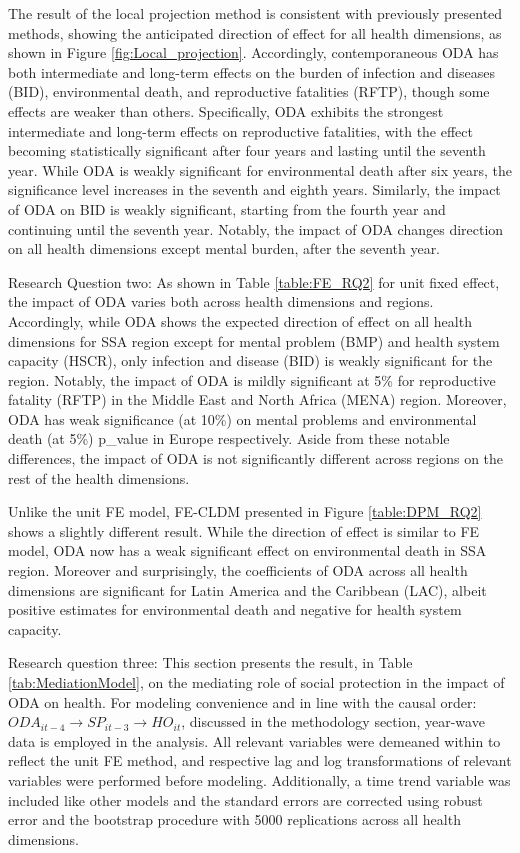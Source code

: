 The result of the local projection method is consistent with previously presented methods, showing the anticipated direction of effect for all health dimensions, as shown in Figure \ref{fig:Local_projection}. Accordingly, contemporaneous ODA has both intermediate and long-term effects on the burden of infection and diseases (BID), environmental death, and reproductive fatalities (RFTP), though some effects are weaker than others. Specifically, ODA exhibits the strongest intermediate and long-term effects on reproductive fatalities, with the effect becoming statistically significant after four years and lasting until the seventh year. While ODA is weakly significant for environmental death after six years, the significance level increases in the seventh and eighth years. Similarly, the impact of ODA on BID is weakly significant, starting from the fourth year and continuing until the seventh year. Notably, the impact of ODA changes direction on all health dimensions except mental burden, after the seventh year.    


Research Question two: 
As shown in Table \ref{table:FE_RQ2} for unit fixed effect, the impact of ODA varies both across health dimensions and regions. Accordingly, while ODA shows the expected direction of effect on all health dimensions for SSA region except for mental problem (BMP) and health system capacity (HSCR), only infection and disease (BID) is weakly significant for the region. Notably, the impact of ODA is mildly significant at 5\% for reproductive fatality (RFTP) in the Middle East and North Africa (MENA) region. Moreover, ODA has weak significance (at 10\%) on mental problems and environmental death (at 5\%) p\_value in Europe respectively. Aside from these notable differences, the impact of ODA is not significantly different across regions on the rest of the health dimensions.

Unlike the unit FE model, FE-CLDM presented in Figure \ref{table:DPM_RQ2} shows a slightly different result. While the direction of effect is similar to FE model, ODA now has a weak significant effect on environmental death in SSA region. Moreover and surprisingly, the coefficients of ODA across all health dimensions are significant for Latin America and the Caribbean (LAC), albeit positive estimates for environmental death and negative for health system capacity.


Research question three: 
This section presents the result, in Table \ref{tab:MediationModel}, on the mediating role of social protection in the impact of ODA on health. For modeling convenience and in line with the causal order: \(ODA_{it-4} \rightarrow SP_{it-3} \rightarrow HO_{it}\), discussed in the methodology section, year-wave data is employed in the analysis. All relevant variables were demeaned within to reflect the unit FE method, and respective lag and log transformations of relevant variables were performed before modeling. Additionally, a time trend variable was included like other models and the standard errors are corrected using robust error and the bootstrap procedure with 5000 replications across all health dimensions.


